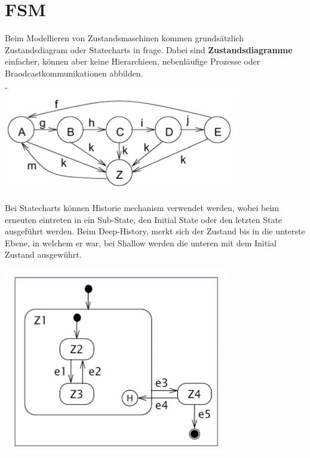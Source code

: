 \section{FSM}
Beim Modellieren von Zustandsmaschinen kommen grundsätzlich Zustandsdiagram oder Statecharts in frage. 
Dabei sind \textbf{Zustandsdiagramme} einfacher, können aber keine Hierarchieen, nebenläufige Prozesse oder Braodcastkommunikationen abbilden.
\begin{center}
	\includegraphics[width=0.8\columnwidth]{Images/zustandsdiagramm}
\end{center}


Bei Statecharts können Historie mechanism verwendet werden, wobei beim erneuten eintreten in ein Sub-State, den Initial State oder den letzten State ausgeführt werden. Beim Deep-History, merkt sich der Zustand bis in die unterste Ebene, in welchem er war, bei Shallow werden die unteren mit dem Initial Zustand ausgewührt.
\begin{center}
	\includegraphics[width=0.8\columnwidth]{Images/statechart}
\end{center}

